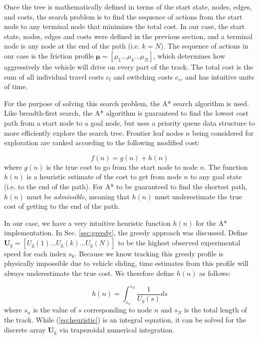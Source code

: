 \documentclass[9pt,shortpaper,twoside,web]{ieeecolor}
\begin{document}
Once the tree is mathematically defined in terms of the start state, nodes, edges, and costs, the search problem is to find the sequence
of actions from the start node to any terminal node that minimizes the total cost. In our case, the start state, nodes, edges
and costs were defined in the previous section, and a terminal node is any node at the end of the path (i.e. $k = N$). The sequence
of actions in our case is the friction profile $\mathbf{\mu} = [\mu_1 \hdots \mu_k \hdots \mu_N]$, which determines how
aggressively the vehicle will drive on every part of the track. The total cost is the sum of all individual travel costs $c_t$ and switching costs
$c_s$, and has intuitive units of time. 


 For the purpose of solving this search problem, the A* search algorithm is used. 
Like breadth-first search, the A* algorithm is guaranteed to find the lowest cost path from a start node to a goal node, 
but uses a priority queue data structure to more efficiently explore the search tree. Frontier leaf nodes $n$ being
considered for exploration are ranked according to the following modified cost:

\begin{equation}
f(n) = g(n) + h(n)
\end{equation}
where $g(n)$ is the true cost to go from the start node to node $n$. The function $h(n)$ is a heuristic estimate of the cost to get from node $n$ to any goal state (i.e. to the end of the
path). For A* to be guaranteed to find the shortest path, $h(n)$ must be \textit{admissible}, meaning that $h(n)$ must underestimate the
true cost of getting to the end of the path. 

In our case, we have a very intuitive heuristic function $h(n)$ for the A* implementation. In Sec. \ref{sec:greedy}, the greedy approach
was discussed. Define $\mathbf{U_\mathrm{g}} = [U_\mathrm{g}(1) \hdots U_\mathrm{g}(k) \hdots U_\mathrm{g}(N)]$ to be the highest observed
experimental speed for each index $s_k$. Because we know tracking this greedy profile is physically impossible due to vehicle sliding, time estimates
from this profile will always underestimate the true cost. We therefore define $h(n)$ as follows:

\begin{equation}
\label{eq:heuristic}
h(n) = \int^{s_N}_{s_n} \frac{1}{U_g(s)} ds
\end{equation}
where $s_n$ is the value of $s$ corresponding to node $n$ and $s_N$ is the total length of the track. While (\ref{eq:heuristic}) is an integral equation, it can be solved for the discrete
array $\mathbf{U}_\mathrm{g}$ via trapezoidal numerical integration.
\end{document}
